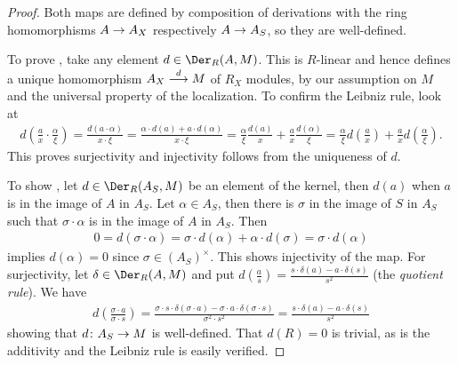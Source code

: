 \documentclass[a4paper,parskip=half,numbers=enddot, DIV=12]{scrreprt}
\begin{document}
\begin{proof}
    Both maps are defined by composition of derivations with the ring homomorphisms $A\morphism A_X$ respectively $A\morphism A_S$, so they are well-defined.
    
    To prove , take any element $d\in \Der_R(A,M)$. This is $R$-linear and hence defines a unique homomorphism $A_X\morphism[d] M$ of $R_X$ modules, by our assumption on $M$ and the universal property of the localization. To confirm the Leibniz rule, look at
    \begin{align*}
        d\left(\frac{a}{x}\cdot \frac{\alpha}{\xi}\right) = \frac{d(a\cdot\alpha)}{x\cdot \xi} = \frac{\alpha\cdot d(a) +a\cdot d(\alpha)}{x\cdot \xi} = \frac{\alpha}{\xi}\frac{d(a)}{x} +\frac{a}{x}\frac{d(\alpha)}{\xi} = \frac{\alpha}{\xi}d\left(\frac{a}{x}\right) +\frac{a}{x}d\left(\frac{\alpha}{\xi}\right).
    \end{align*}
    This proves surjectivity and injectivity follows from the uniqueness of $d$.
    
    To show , let $d\in\Der_R(A_S,M)$ be an element of the kernel, then $d(a)$ when $a$ is in the image of $A$ in $A_S$. Let $\alpha\in A_S$, then there is $\sigma$ in the image of $S$ in $A_S$ such that $\sigma\cdot \alpha$ is in the image of $A$ in $A_S$. Then 
    \begin{align*}
        0 = d(\sigma\cdot \alpha) = \sigma \cdot d(\alpha) + \alpha\cdot d(\sigma) = \sigma\cdot d(\alpha)
    \end{align*}
    implies $d(\alpha) = 0$ since $\sigma\in (A_S)^\times$. This shows injectivity of the map. For surjectivity, let $\delta\in \Der_R(A,M)$ and put $d\left(\frac{a}{s}\right) = \frac{s\cdot\delta(a) - a\cdot\delta(s)}{s^2}$ (the \emph{quotient rule}). We have
    \begin{align*}
        d\left(\frac{\sigma\cdot a}{\sigma \cdot s}\right) = \frac{\sigma\cdot s\cdot \delta(\sigma\cdot a) - \sigma \cdot a \cdot \delta(\sigma\cdot s)}{\sigma^2\cdot s^2} = \frac{s\cdot \delta(a)-a\cdot\delta(s)}{s^2}
    \end{align*}
    showing that $d\colon A_S\morphism M$ is well-defined. That $d(R)=0$ is trivial, as is the additivity and the Leibniz rule is easily verified.
\end{proof}
\end{document}
